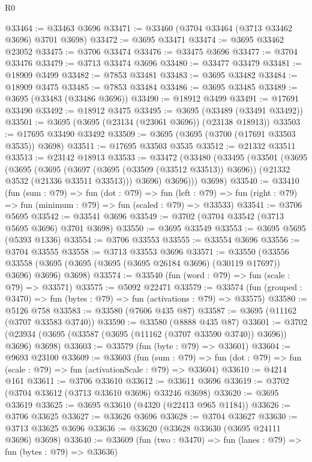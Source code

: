 \begin{lexlean}{R0}
\begin{coremodule}
@33464 := @33463 @3696
@33471 := @33460 (@3704 @33464 (@3713 @33462 @3696) @3701 @3698)
@33472 := @3695 @33471
@33474 := @3695 @33462 @23052
@33475 := @3706 @33474
@33476 := @33475 @3696
@33477 := @3704 @33476
@33479 := @3713 @33474 @3696
@33480 := @33477 @33479
@33481 := @18909 @3499
@33482 := @7853 @33481
@33483 := @3695 @33482
@33484 := @18909 @3475
@33485 := @7853 @33484
@33486 := @3695 @33485
@33489 := @3695 (@33483 (@33486 @3696))
@33490 := @18912 @3499
@33491 := @17691 @33490
@33492 := @18912 @3475
@33495 := @3695 (@33489 (@33491 @33492))
@33501 := @3695 (@3695 (@23134 (@23061 @3696)) (@23138 @18913))
@33503 := @17695 @33490 @33492
@33509 := @3695 (@3695 (@3700 (@17691 @33503 @3535)) @3698)
@33511 := @17695 @33503 @3535
@33512 := @21332 @33511
@33513 := @23142 @18913
@33533 := @33472
    (@33480
      (@33495
        (@33501
          (@3695
            (@3695
              (@3695
                (@3697 (@3695 (@33509 (@33512 @33513)) @3696))
                (@21332 @3532 (@21336 @33511 @33513)))
              @3696)
            @3696)))
      @3698)
@33540 := @33410
    (fun (sum : @79) =>
    fun (dot : @79) =>
    fun (left : @79) => fun (right : @79) => fun (minimum : @79) => fun (scaled : @79) => @33533)
@33541 := @3706 @5695
@33542 := @33541 @3696
@33549 := @3702 (@3704 @33542 (@3713 @5695 @3696) @3701 @3698)
@33550 := @3695 @33549
@33553 := @3695 @5695 (@5393 @1336)
@33554 := @3706 @33553
@33555 := @33554 @3696
@33556 := @3704 @33555
@33558 := @3713 @33553 @3696
@33571 := @33550
    (@33556 @33558 (@3695 (@3695 (@3695 (@3695 @26184 @3696) (@30119 @17697)) @3696) @3696) @3698)
@33574 := @33540 (fun (word : @79) => fun (scale : @79) => @33571)
@33575 := @5092 @22471
@33579 := @33574 (fun (grouped : @3470) => fun (bytes : @79) => fun (activations : @79) => @33575)
@33580 := @5126 @758
@33583 := @33580 (@7606 @435 @87)
@33587 := @3695 (@11162 (@3707 @33583 @3740))
@33590 := @33580 (@8888 @435 @87)
@33601 := @3702 (@23934 (@3695 (@33587 (@3695 (@11162 (@3707 @33590 @3740)) @3696)) @3696) @3698)
@33603 := @33579 (fun (byte : @79) => @33601)
@33604 := @9693 @23100
@33609 := @33603
    (fun (sum : @79) =>
    fun (dot : @79) => fun (scale : @79) => fun (activationScale : @79) => @33604)
@33610 := @4214 @161
@33611 := @3706 @33610
@33612 := @33611 @3696
@33619 := @3702 (@3704 @33612 (@3713 @33610 @3696) @33246 @3698)
@33620 := @3695 @33619
@33625 := @3695 @33610 (@4320 (@22413 @965 @1184))
@33626 := @3706 @33625
@33627 := @33626 @3696
@33628 := @3704 @33627
@33630 := @3713 @33625 @3696
@33636 := @33620 (@33628 @33630 (@3695 @24111 @3696) @3698)
@33640 := @33609 (fun (two : @3470) => fun (lanes : @79) => fun (bytes : @79) => @33636)

\end{coremodule}
\end{lexlean}

